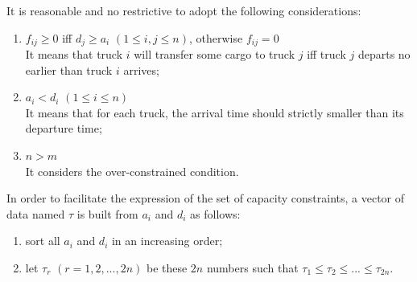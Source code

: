 \documentclass[preprint,12pt,authoryear]{elsarticle}
\begin{document}
\noindent
It is reasonable and no restrictive to adopt the following considerations:
\begin{enumerate}
    \item $f_{ij} \geq  0$ iff $d_{j} \geq a_{i}$ $(1 \leq i,j \leq n)$, otherwise $f_{ij} = 0$ \\
    It means that truck $i$ will transfer some cargo to truck $j$ iff truck $j$ departs no earlier than truck $i$ arrives;
    
    \item $a_{i} < d_i$ $(1 \leq i \leq n)$\\
    It means that for each truck, the arrival time should strictly smaller than its departure time;
    
    \item $n > m$\\ 
    It considers the over-constrained condition.
\end{enumerate}
\medskip

\noindent
In order to facilitate the expression of the set of capacity constraints, a vector of data named $\tau$ 
is built from $a_{i}$ and $d_{i}$ as follows:


    \begin{enumerate}
        \item sort all $a_{i}$ and $d_{i}$ in an increasing order;
        \item let $\tau_r$ 
        $(r = 1, 2, ..., 2n)$ be these $2n$ numbers such that $\tau_{1} \leq \tau_{2} \leq ... \leq \tau_{2n}$.
    \end{enumerate}    

%
%
\end{document}
